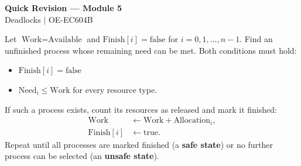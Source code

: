 \documentclass[12pt,a4paper]{article}
\begin{document}
\newpage
\begin{center}
  {\large\bfseries\color{myred} Quick Revision --- Module 5}\\[3pt]
  {\small\color{mydark} Deadlocks $|$ OE-EC604B}
\end{center}
\noindent{\color{myred}\rule{\linewidth}{1.2pt}}
\vspace{4pt}

\begin{tcolorbox}[formulabox, title={\textbf{Banker's Safety Algorithm Equations}}]
Let $\text{Work} = \text{Available}$ and $\text{Finish}[i] = \text{false}$ for $i = 0, 1, \dots, n-1$.
Find an unfinished process whose remaining need can be met. Both conditions must hold:
\begin{itemize}[leftmargin=*, itemsep=2pt, topsep=2pt]
  \item $\text{Finish}[i] = \text{false}$
  \item $\text{Need}_i \le \text{Work}$ for every resource type.
\end{itemize}
If such a process exists, count its resources as released and mark it finished:
\[
\begin{aligned}
  \text{Work} &\gets \text{Work} + \text{Allocation}_i,\\
  \text{Finish}[i] &\gets \text{true}.
\end{aligned}
\]
Repeat until all processes are marked finished (a \textbf{safe state}) or no further process can be selected (an \textbf{unsafe state}).
\end{tcolorbox}
\end{document}
